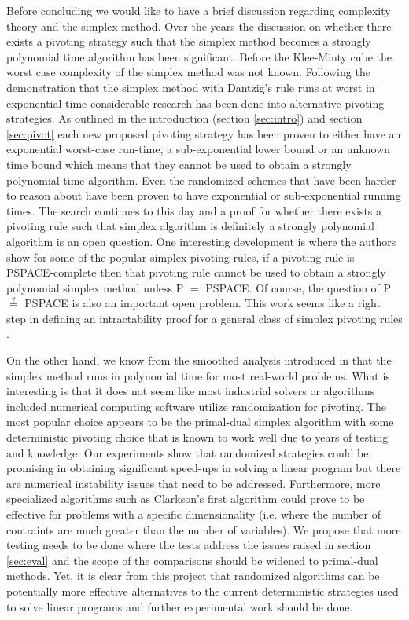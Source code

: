 \documentclass{standalone}
\begin{document}
  Before concluding we would like to have a brief discussion regarding complexity theory and the simplex method. Over the years the discussion on whether there exists a pivoting strategy such that the simplex method becomes a strongly polynomial time algorithm has been significant. Before the Klee-Minty cube \cite{klee1972good} the worst case complexity of the simplex method was not known. Following the demonstration that the simplex method with Dantzig's rule runs at worst in exponential time considerable research has been done into alternative pivoting strategies. As outlined in the introduction (section \ref{sec:intro}) and section \ref{sec:pivot} each new proposed pivoting strategy has been proven to either have an exponential worst-case run-time, a sub-exponential lower bound or an unknown time bound which means that they cannot be used to obtain a strongly polynomial time algorithm. Even the randomized schemes that have been harder to reason about have been proven to have exponential \cite{broder1995worst} or sub-exponential \cite{goldwasser1995survey} running times. The search continues to this day and a proof for whether there exists a pivoting rule such that simplex algorithm is definitely a strongly polynomial algorithm is an open question. One interesting development is \cite{adler2014simplex} where the authors show for some of the popular simplex pivoting rules, if a pivoting rule is PSPACE-complete then that pivoting rule cannot be used to obtain a strongly polynomial simplex method unless P $=$ PSPACE. Of course, the question of P $\overset{?}{=}$ PSPACE is also an important open problem. This work seems like a right step in defining an intractability proof for a general class of simplex pivoting rules \cite{adler2014simplex}.\par
  On the other hand, we know from the smoothed analysis introduced in \cite{spielman2004smoothed} that the simplex method runs in polynomial time for most real-world problems. What is interesting is that it does not seem like most industrial solvers or algorithms included numerical computing software utilize randomization for pivoting. The most popular choice appears to be the primal-dual simplex algorithm with some deterministic pivoting choice that is known to work well due to years of testing and knowledge. Our experiments show that randomized strategies could be promising in obtaining significant speed-ups in solving a linear program but there are numerical instability issues that need to be addressed. Furthermore, more specialized algorithms such as Clarkson's first algorithm could prove to be effective for problems with a specific dimensionality (i.e. where the number of contraints are much greater than the number of variables). We propose that more testing needs to be done where the tests address the issues raised in section \ref{sec:eval} and the scope of the comparisons should be widened to primal-dual methods. Yet, it is clear from this project that randomized algorithms can be potentially more effective alternatives to the current deterministic strategies used to solve linear programs and further experimental work should be done.
\end{document}
